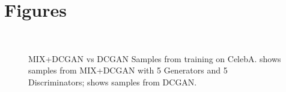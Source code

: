 \documentclass{article}
\begin{document}

\newpage
\section*{Figures}
    
\begin{figure}[!htb]%
  \centering
  \hspace{8pt}%
  \\
  \caption{MIX+DCGAN vs DCGAN Samples from training on CelebA. \protect{} shows samples from MIX+DCGAN with 5 Generators and 5 Discriminators; \protect{} shows samples from DCGAN.}
  \label{fig:ex3}%
\end{figure}
\end{document}

